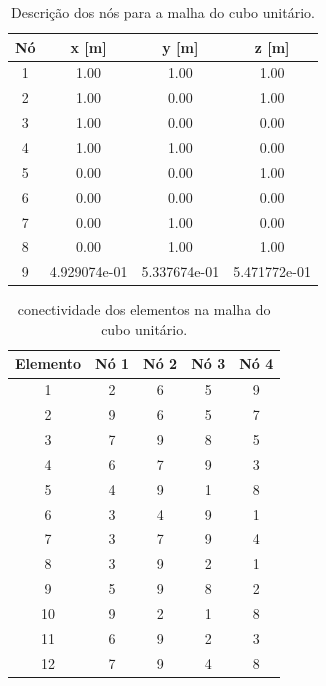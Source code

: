 \begin{table}
    \centering
    \caption{Descrição dos nós para a malha do cubo unitário.}
    \begin{tabular}{c | c c c}
        \toprule
        \textbf{Nó} & \textbf{x} [m]  & \textbf{y}  [m]  & \textbf{z}  [m]  \\
        \midrule
        1 & 1.00 & 1.00 & 1.00 \\
        2 & 1.00 & 0.00 & 1.00\\
        3 & 1.00 & 0.00 & 0.00 \\
        4 & 1.00 & 1.00 & 0.00 \\
        5 & 0.00 & 0.00 & 1.00 \\
        6 & 0.00 & 0.00 & 0.00 \\
        7 & 0.00 & 1.00 & 0.00 \\
        8 & 0.00 & 1.00 & 1.00 \\
        9 & 4.929074e-01 & 5.337674e-01 & 5.471772e-01 \\
        \bottomrule
    \end{tabular}
    \label{tab:nos_cubo}
\end{table}

\begin{table}
    \centering
    \caption{conectividade dos elementos na malha do cubo unitário.}
    \begin{tabular}{c | c c c c}
        \toprule
        \textbf{Elemento} & \textbf{Nó 1} & \textbf{Nó 2} & \textbf{Nó 3}  & \textbf{Nó 4} \\
        \midrule
        1 & 2 & 6 & 5 & 9 \\
        2 & 9 & 6 & 5 & 7 \\
        3 & 7 & 9 & 8 & 5 \\
        4 & 6 & 7 & 9 & 3 \\
        5 & 4 & 9 & 1 & 8 \\
        6 & 3 & 4 & 9 & 1 \\
        7 & 3 & 7 & 9 & 4 \\
        8 & 3 & 9 & 2 & 1 \\
        9 & 5 & 9 & 8 & 2 \\
        10 & 9 & 2 & 1 & 8 \\
        11 & 6 & 9 & 2 & 3 \\
        12 & 7 & 9 & 4 & 8 \\
        \bottomrule
    \end{tabular}
    \label{tab:elementos_cubo}
\end{table}

